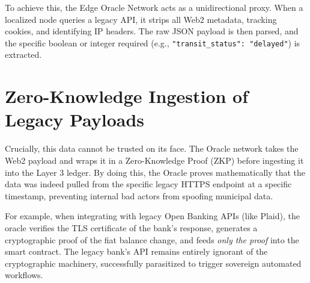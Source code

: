 To achieve this, the Edge Oracle Network acts as a unidirectional proxy. When a localized node queries a legacy API, it strips all Web2 metadata, tracking cookies, and identifying IP headers. The raw JSON payload is then parsed, and the specific boolean or integer required (e.g., \texttt{"transit\_status": "delayed"}) is extracted. 

\section{Zero-Knowledge Ingestion of Legacy Payloads}
Crucially, this data cannot be trusted on its face. The Oracle network takes the Web2 payload and wraps it in a Zero-Knowledge Proof (ZKP) before ingesting it into the Layer 3 ledger. By doing this, the Oracle proves mathematically that the data was indeed pulled from the specific legacy HTTPS endpoint at a specific timestamp, preventing internal bad actors from spoofing municipal data. 

For example, when integrating with legacy Open Banking APIs (like Plaid), the oracle verifies the TLS certificate of the bank's response, generates a cryptographic proof of the fiat balance change, and feeds \textit{only the proof} into the smart contract. The legacy bank's API remains entirely ignorant of the cryptographic machinery, successfully parasitized to trigger sovereign automated workflows.
